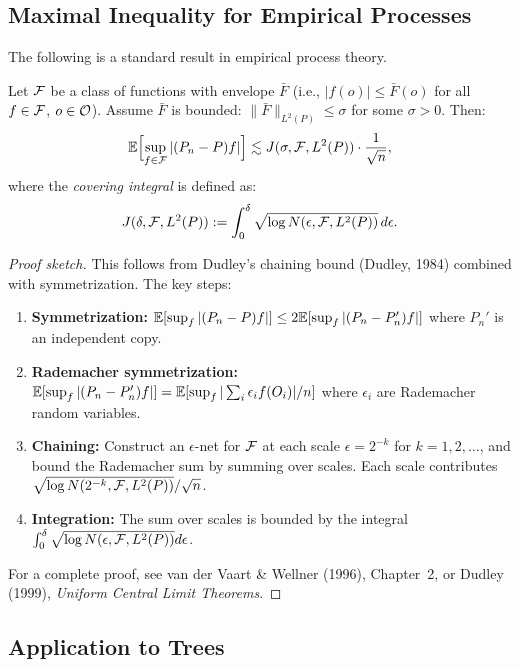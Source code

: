 \documentclass[12pt]{article}
\begin{document}
\subsection{Maximal Inequality for Empirical Processes}

The following is a standard result in empirical process theory.

\begin{theorem}
\label{thm:maximal-ineq}
Let $\mathcal{F}$ be a class of functions with envelope $\bar{F}$ (i.e., $|f(o)| \le \bar{F}(o)$ for all $f \in \mathcal{F}$, $o \in \mathcal{O}$). Assume $\bar{F}$ is bounded: $\|\bar{F}\|_{L^2(P)} \le \sigma$ for some $\sigma > 0$. Then:
\[
\mathbb{E} \Bigl[ \sup_{f \in \mathcal{F}} |(P_n - P) f| \Bigr] \lesssim J(\sigma, \mathcal{F}, L^2(P)) \cdot \frac{1}{\sqrt{n}},
\]
where the \emph{covering integral} is defined as:
\[
J(\delta, \mathcal{F}, L^2(P)) := \int_0^\delta \sqrt{\log N(\epsilon, \mathcal{F}, L^2(P))} \, d\epsilon.
\]
\end{theorem}

\begin{proof}[Proof sketch]
This follows from Dudley's chaining bound (Dudley, 1984) combined with symmetrization. The key steps:
\begin{enumerate}
\item \textbf{Symmetrization:} $\mathbb{E}[\sup_f |(P_n - P)f|] \le 2 \mathbb{E}[\sup_f |(P_n - P_n') f|]$ where $P_n'$ is an independent copy.
\item \textbf{Rademacher symmetrization:} $\mathbb{E}[\sup_f |(P_n - P_n') f|] = \mathbb{E}[\sup_f |\sum_i \epsilon_i f(O_i)| / n]$ where $\epsilon_i$ are Rademacher random variables.
\item \textbf{Chaining:} Construct an $\epsilon$-net for $\mathcal{F}$ at each scale $\epsilon = 2^{-k}$ for $k = 1, 2, \ldots$, and bound the Rademacher sum by summing over scales. Each scale contributes $\sqrt{\log N(2^{-k}, \mathcal{F}, L^2(P))} / \sqrt{n}$.
\item \textbf{Integration:} The sum over scales is bounded by the integral $\int_0^\delta \sqrt{\log N(\epsilon, \mathcal{F}, L^2(P))} d\epsilon$.
\end{enumerate}
For a complete proof, see van der Vaart \& Wellner (1996), Chapter~2, or Dudley (1999), \emph{Uniform Central Limit Theorems}.
\end{proof}

\subsection{Application to Trees}
\end{document}

